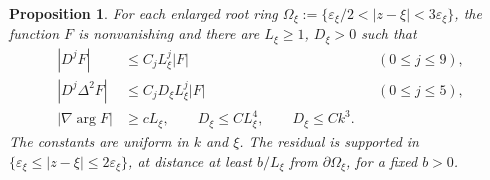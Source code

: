 \documentclass[11pt,a4paper,leqno]{amsart}
\numberwithin{equation}{section}
\theoremstyle{landisplain}
\newtheorem{proposition}[theorem]{Proposition}
\theoremstyle{landisdefinition}
\theoremstyle{landisremark}
\newcommand{\pa}{\partial}
\newcommand{\eps}{\varepsilon}
\begin{document}
\begin{proposition}\label{prop:patch}
For each enlarged root ring
$\Omega_\xi:=\{\eps_\xi/2<|z-\xi|<3\eps_\xi\}$, the
function $F$ is nonvanishing and there are $L_\xi\ge1$, $D_\xi>0$
such that
\begin{align}
 |D^jF|&\le C_jL_\xi^j|F| &&(0\le j\le9),\label{eq:patchF}\\
 |D^j\Delta^2F|&\le C_jD_\xi L_\xi^j|F|
                                      &&(0\le j\le5),\label{eq:patchE}\\
 |\nabla\arg F|&\ge cL_\xi,
 \qquad D_\xi\le CL_\xi^4,
 \qquad D_\xi\le Ck^3.\label{eq:patchphase}
\end{align}
The constants are uniform in $k$ and $\xi$. The residual is supported
in $\{\eps_\xi\le|z-\xi|\le2\eps_\xi\}$, at distance at least
$b/L_\xi$ from $\pa\Omega_\xi$, for a fixed $b>0$.
\end{proposition}
\end{document}
